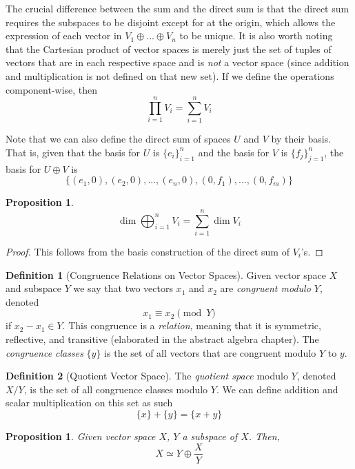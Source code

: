 \documentclass{article}
\newtheorem{proposition}[theorem]{Proposition}
\theoremstyle{remark}
\theoremstyle{definition}
\newtheorem{definition}{Definition}[section]
\begin{document}
    The crucial difference between the sum and the direct sum is that the direct sum requires the subspaces to be disjoint except for at the origin, which allows the expression of each vector in $V_1 \oplus ... \oplus V_n$ to be unique. It is also worth noting that the Cartesian product of vector spaces is merely just the set of tuples of vectors that are in each respective space and is \textit{not} a vector space (since addition and multiplication is not defined on that new set). If we define the operations component-wise, then 
    \[ \prod_{i=1}^n V_i = \sum_{i=1}^n V_i\]

    Note that we can also define the direct sum of spaces $U$ and $V$ by their basis. That is, given that the basis for $U$ is $\{e_i\}_{i=1}^n$ and the basis for $V$ is $\{f_j\}_{j=1}^n$, the basis for $U \oplus V$ is
    \[\{(e_1, 0), (e_2, 0), ..., (e_n, 0), (0, f_1), ..., (0, f_m)\} \]

    \begin{proposition}
    \[\dim{\bigoplus_{i=1}^n V_i} = \sum_{i=1}^n \dim{V_i}\]
    \end{proposition}
    \begin{proof}
    This follows from the basis construction of the direct sum of $V_i$'s. 
    \end{proof}

    \begin{definition}[Congruence Relations on Vector Spaces]
    Given vector space $X$ and subspace $Y$ we say that two vectors $x_1$ and $x_2$ are \textit{congruent modulo $Y$}, denoted 
    \[ x_1 \equiv x_2 \pmod{Y}\]
    if $x_2 - x_1 \in Y$. This congruence is a \textit{relation}, meaning that it is symmetric, reflective, and transitive (elaborated in the abstract algebra chapter). The \textit{congruence classes} $\{ y\}$ is the set of all vectors that are congruent modulo $Y$ to $y$. 
    \end{definition}

    \begin{definition}[Quotient Vector Space]
    The \textit{quotient space} modulo $Y$, denoted $ X / Y$, is the set of all congruence classes modulo $Y$. We can define addition and scalar multiplication on this set as such 
    \[ \{ x\} + \{ y\} = \{ x + y\}\]
    \end{definition}

    \begin{proposition}
    Given vector space $X$, $Y$ a subspace of $X$. Then, 
    \[ X \simeq Y \oplus \frac{X}{Y}\]
    \end{proposition}
\end{document}
